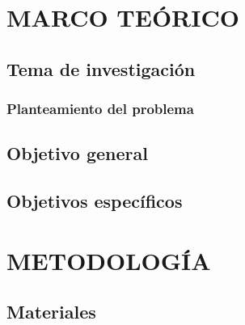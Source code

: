 \documentclass{tesis}
\begin{document}



\setcounter{page}{2}
% 
% 
% 
% 
% 
% 

% 
% 


\newpage
\renewcommand{\thepage}{\arabic{page}}%
\setcounter{page}{1}

\chapter{MARCO TEÓRICO}

\section{Tema de investigación}
 {\MakeUppercase\tema}

\subsection{Planteamiento del problema}




\section{Objetivo general}


\section{Objetivos específicos}


\chapter{METODOLOGÍA}
\section{Materiales}
\end{document}
